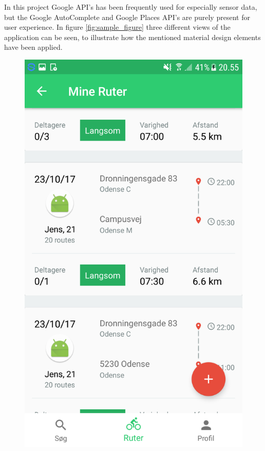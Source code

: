 In this project Google API's has been frequently used for especially sensor data, but the Google AutoComplete and Google Places API's are purely present for user experience. In figure \ref{fig:sample_figure} three different views of the application can be seen, to illustrate how the mentioned material design elements have been applied. 

\begin{figure}[H]
\centering
\begin{minipage}{0.32\textwidth}
\centering
    \includegraphics[width=0.8\linewidth]{Graphics/Images/bikebus_search.png}
\end{minipage}\hfill
\begin{minipage}{0.32\textwidth}
\centering

\end{minipage}
\end{figure}

